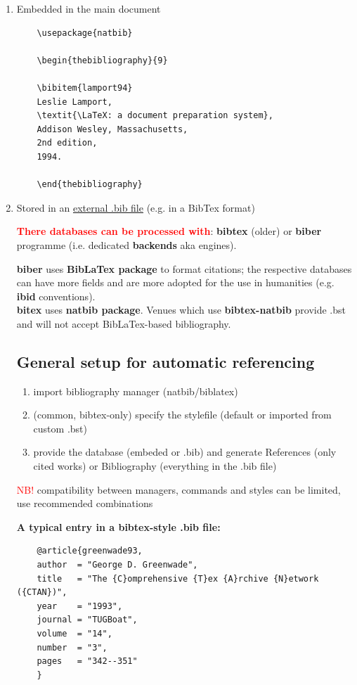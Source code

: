 \documentclass[a4paper,11pt]{article}
\begin{document}
\begin{enumerate}
\item Embedded in the main document
	\begin{lstlisting}
	\usepackage{natbib}
	
	\begin{thebibliography}{9}
	
	\bibitem{lamport94}
	Leslie Lamport,
	\textit{\LaTeX: a document preparation system},
	Addison Wesley, Massachusetts,
	2nd edition,
	1994.
	
	\end{thebibliography}
	\end{lstlisting}

\item Stored in an \href{run:./7_NLP-tasks-complexity.bib}{external .bib file} (e.g. in a BibTex format)

\medskip

\textbf{\textcolor{red}{There databases can be processed with}}: \textbf{bibtex} (older) or \textbf{biber} programme (i.e. dedicated \textbf{backends} aka engines).

\textbf{biber} uses \textbf{BibLaTex package} to format citations; the respective databases can have more fields and are more adopted for the use in humanities (e.g. \textbf{ibid} conventions).\\
\textbf{bitex} uses \textbf{natbib package}.
Venues which use \textbf{bibtex-natbib} provide .bst and will not accept BibLaTex-based bibliography.



\subsection{General setup for automatic referencing}

\begin{enumerate}
	\item import bibliography manager (natbib/biblatex) 
	\item (common, bibtex-only) specify the stylefile (default or imported from custom .bst)
	\item provide the database (embeded or .bib) and generate References (only cited works) or Bibliography (everything in the .bib file)

\end{enumerate}
	\textcolor{red}{NB!} compatibility between managers, commands and styles can be limited, use recommended combinations

\textbf{A typical entry in a bibtex-style .bib file:}\\

\begin{lstlisting}
	@article{greenwade93,
	author  = "George D. Greenwade",
	title   = "The {C}omprehensive {T}ex {A}rchive {N}etwork ({CTAN})",
	year    = "1993",
	journal = "TUGBoat",
	volume  = "14",
	number  = "3",
	pages   = "342--351"
	}
\end{lstlisting}

\end{enumerate}	
\end{document}

